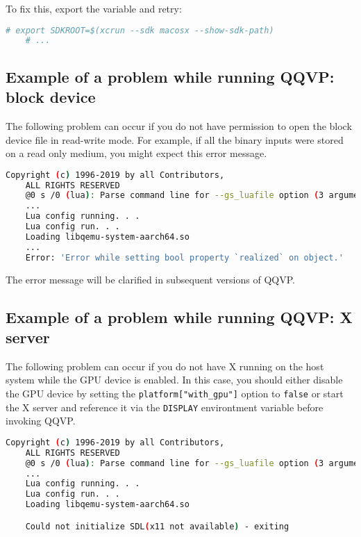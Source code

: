 To fix this, export the variable and retry:

\small
\begin{lstlisting}[language=bash]
    # export SDKROOT=$(xcrun --sdk macosx --show-sdk-path)
    # ...
\end{lstlisting}
\normalsize

\clearpage
\subsection{Example of a problem while running QQVP: block device}

The following problem can occur if you do not have permission to open the block device file in read-write mode. For example, if all the binary inputs were stored on a read only medium, you might expect this error message.

\small
\begin{lstlisting}[language=bash]
    Copyright (c) 1996-2019 by all Contributors,
    ALL RIGHTS RESERVED
    @0 s /0 (lua): Parse command line for --gs_luafile option (3 arguments)
    ...
    Lua config running. . .
    Lua config run. . .
    Loading libqemu-system-aarch64.so
    ...
    Error: 'Error while setting bool property `realized` on object.'
\end{lstlisting}
\normalsize

\note The error message will be clarified in subsequent versions of QQVP.

\subsection{Example of a problem while running QQVP: X server}
\label{sec:xServer}

The following problem can occur if you do not have X running on the host
system while the GPU device is enabled. In this case, you should either
disable the GPU device by setting the {\small{\lstinline!platform["with_gpu"]!}}
option to {\small{\lstinline!false!}} or start the X server and reference
it via the {\small{\lstinline!DISPLAY!}} environtment variable before invoking
QQVP.

\small
\begin{lstlisting}[language=bash]
    Copyright (c) 1996-2019 by all Contributors,
    ALL RIGHTS RESERVED
    @0 s /0 (lua): Parse command line for --gs_luafile option (3 arguments)
    ...
    Lua config running. . .
    Lua config run. . .
    Loading libqemu-system-aarch64.so

    Could not initialize SDL(x11 not available) - exiting
\end{lstlisting}
\normalsize

